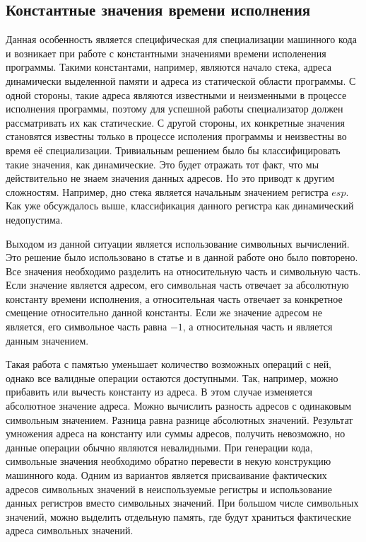 \documentclass{spbau-diploma}
\begin{document}
\subsection{ Константные значения времени исполнения}
Данная особенность является специфическая для специализации машинного кода и возникает при работе с константными значениями времени исполенения программы. Такими константами, например, являются начало стека, адреса динамически выделенной памяти и адреса из статической области программы. С одной стороны, такие адреса являются известными и неизменными в процессе исполнения программы, поэтому для успешной работы специализатор должен рассматривать их как статические. С другой стороны, их конкретные значения становятся известны только в процессе исполения программы и неизвестны во время её специализации.  Тривиальным решением было бы классифицировать такие значения, как динамические. Это будет отражать тот факт, что мы действительно не знаем значения данных адресов. Но это приводт к другим сложностям. Например, дно стека является начальным значением регистра $esp$. Как уже обсуждалось выше, классификация данного регистра как динамический недопустима. 

Выходом из данной ситуации является использование символьных вычислений. Это решение было использовано в статье \cite{PEMC} и в данной работе оно было повторено. Все значения необходимо разделить на относительную часть и символьную часть. Если значение является адресом, его символьная часть отвечает за абсолютную константу времени исполнения, а относительная часть отвечает за конкретное смещение относительно данной константы. Если же значение адресом не является, его символьное часть равна $-1$, а относительная часть и является данным значением. 

Такая работа с памятью уменьшает количество возможных операций с ней, однако все валидные операции остаются доступными. Так, например, можно прибавить или вычесть константу из адреса. В этом случае изменяется абсолютное значение адреса. Можно вычислить разность адресов с одинаковым символьным значением. Разница равна разнице абсолютных значений. Результат умножения адреса на константу или суммы адресов, получить невозможно, но данные операции обычно являются невалидными. При генерации кода, символьные значения необходимо обратно перевести в некую конструкцию машинного кода. Одним из вариантов является присваивание фактических адресов символьных значений в неиспользуемые регистры и использование данных регистров вместо символьных значений. При большом числе символьных значений, можно выделить отдельную память, где будут храниться фактические адреса символьных значений.
\end{document}
